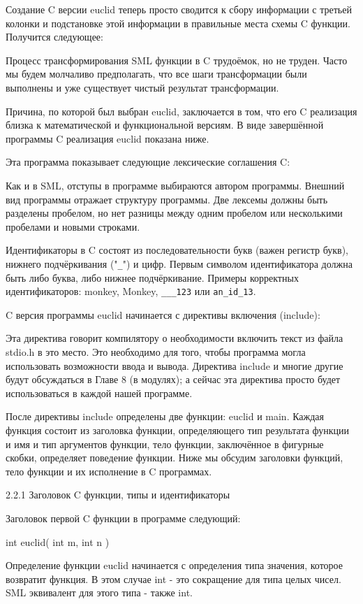 Создание C версии euclid теперь просто сводится к сбору информации с третьей колонки и подстановке этой информации в правильные места схемы C функции. Получится следующее:

Процесс трансформирования SML функции в C трудоёмок, но не труден. Часто мы будем молчаливо предполагать, что все шаги трансформации были выполнены и уже существует чистый результат трансформации.

Причина, по которой был выбран euclid, заключается в том, что его C реализация близка к математической и функциональной версиям. В виде завершённой программы C реализация euclid показана ниже.

Эта программа показывает следующие лексические соглашения C:

Как и в SML, отступы в программе выбираются автором программы. Внешний вид программы отражает структуру программы. Две лексемы должны быть разделены пробелом, но нет разницы между одним пробелом или несколькими пробелами и новыми строками.

Идентификаторы в C состоят из последовательности букв (важен регистр букв), нижнего подчёркивания ("\lstinline|_|") и цифр. Первым символом идентификатора должна быть либо буква, либо нижнее подчёркивание. Примеры корректных идентификаторов: monkey, Monkey, \lstinline|___123| или \lstinline|an_id_13|.

C версия программы euclid начинается с директивы включения (include):

Эта директива говорит компилятору о необходимости включить текст из файла stdio.h в это место. Это необходимо для того, чтобы программа могла использовать возможности ввода и вывода. Директива include и многие другие будут обсуждаться в Главе 8 (в модулях); а сейчас эта директива просто будет использоваться в каждой нашей программе.

После директивы include определены две функции: euclid и main. Каждая функция состоит из заголовка функции, определяющего тип результата функции и имя и тип аргументов функции, тело функции, заключённое в фигурные скобки, определяет поведение функции. Ниже мы обсудим заголовки функций, тело функции и их исполнение в C программах.

2.2.1 Заголовок C функции, типы и идентификаторы

Заголовок первой C функции в программе следующий:

int euclid( int m, int n )

Определение функции euclid начинается с определения типа значения, которое возвратит функция. В этом случае int - это сокращение для типа целых чисел. SML эквивалент для этого типа - также int.

